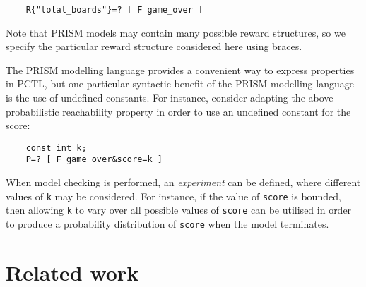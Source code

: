 \begin{verbatim}
    R{"total_boards"}=? [ F game_over ]
\end{verbatim}

Note that PRISM models may contain many possible reward structures, so we specify the particular reward structure considered here using braces.

The PRISM modelling language provides a convenient way to express properties in PCTL, but one particular syntactic benefit of the PRISM modelling language is the use of undefined constants. For instance, consider adapting the above probabilistic reachability property in order to use an undefined constant for the score:

\begin{verbatim}
    const int k;
    P=? [ F game_over&score=k ]
\end{verbatim}

When model checking is performed, an \emph{experiment} can be defined, where different values of \verb+k+ may be considered. For instance, if the value of \verb+score+ is bounded, then allowing \verb+k+ to vary over all possible values of \verb+score+ can be utilised in order to produce a probability distribution of \verb+score+ when the model terminates.

% 
% 

\section{Related work}


\label{back:related}

